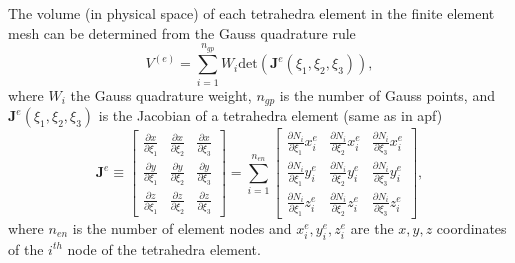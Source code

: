 \documentclass[12pt,aps,pre]{revtex4}
\begin{document}
The volume (in physical space) of each tetrahedra element in the finite element mesh can be determined from the Gauss quadrature rule
%
\begin{equation}
V^{(e)} = \sum_{i=1}^{n_{gp}} W_i \text{det}(\pmb{J}^e(\xi_1,\xi_2,\xi_3)),
\end{equation}
%
where $W_i$ the Gauss quadrature weight, $n_{gp}$ is the number of Gauss points, and $\pmb{J}^e(\xi_1,\xi_2,\xi_3)$ is the Jacobian of a tetrahedra element (same as in apf)
%
\begin{equation}
\pmb{J}^e \equiv 
\begin{bmatrix}
\frac{\partial x}{\partial \xi_1} & \frac{\partial x}{\partial \xi_2} & \frac{\partial x}{\partial \xi_3} \\
\frac{\partial y}{\partial \xi_1} & \frac{\partial y}{\partial \xi_2} & \frac{\partial y}{\partial \xi_3} \\
\frac{\partial z}{\partial \xi_1} & \frac{\partial z}{\partial \xi_2} & \frac{\partial z}{\partial \xi_3} 
\end{bmatrix} = 
%
\sum_{i=1}^{n_{en}}
\begin{bmatrix}
\frac{\partial N_i}{\partial \xi_1} x_i^e & \frac{\partial N_i}{\partial \xi_2} x_i^e & \frac{\partial N_i}{\partial \xi_3} x_i^e \\
%
\frac{\partial N_i}{\partial \xi_1}y_i^e & \frac{\partial N_i}{\partial \xi_2}y_i^e & \frac{\partial N_i}{\partial \xi_3}y_i^e \\
%
\frac{\partial N_i}{\partial \xi_1}z_i^e & \frac{\partial N_i}{\partial \xi_2}z_i^e & \frac{\partial N_i}{\partial \xi_3}z_i^e 
\end{bmatrix},
\label{eq:jacobian}
\end{equation}
%
where $n_{en}$ is the number of element nodes and $x_i^e, y_i^e, z_i^e$ are the $x,y,z$ coordinates of the $i^{th}$ node of the tetrahedra element.
\end{document}
